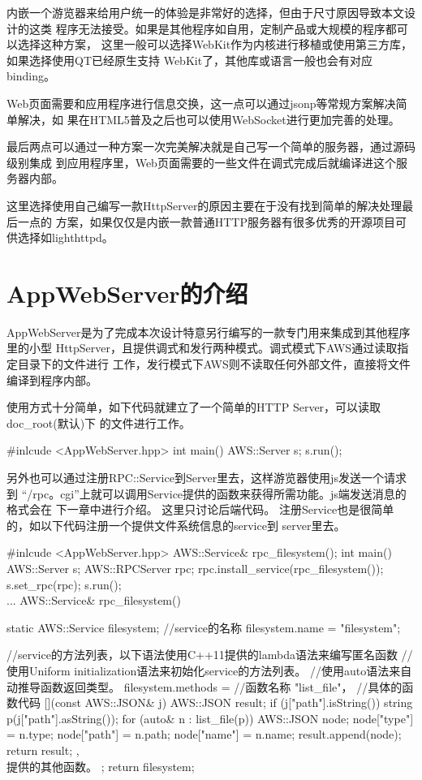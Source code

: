 内嵌一个游览器来给用户统一的体验是非常好的选择，但由于尺寸原因导致本文设计的这类
程序无法接受。如果是其他程序如自用，定制产品或大规模的程序都可以选择这种方案，
这里一般可以选择WebKit作为内核进行移植或使用第三方库，如果选择使用QT已经原生支持
WebKit了，其他库或语言一般也会有对应binding。

Web页面需要和应用程序进行信息交换，这一点可以通过jsonp等常规方案解决简单解决，如
果在HTML5普及之后也可以使用WebSocket进行更加完善的处理。

最后两点可以通过一种方案一次完美解决就是自己写一个简单的服务器，通过源码级别集成
到应用程序里，Web页面需要的一些文件在调式完成后就编译进这个服务器内部。

这里选择使用自己编写一款HttpServer的原因主要在于没有找到简单的解决处理最后一点的
方案，如果仅仅是内嵌一款普通HTTP服务器有很多优秀的开源项目可供选择如lighthttpd。

\section{AppWebServer的介绍} \label{sec:aws}
AppWebServer是为了完成本次设计特意另行编写的一款专门用来集成到其他程序里的小型
HttpServer，且提供调式和发行两种模式。调式模式下AWS通过读取指定目录下的文件进行
工作，发行模式下AWS则不读取任何外部文件，直接将文件编译到程序内部。

使用方式十分简单，如下代码就建立了一个简单的HTTP Server，可以读取doc\_root(默认)下
的文件进行工作。
\begin{cppcode}
#inlcude <AppWebServer.hpp>
int main()
{
	AWS::Server s;
	s.run();
}
\end{cppcode}
另外也可以通过注册RPC::Service到Server里去，这样游览器使用js发送一个请求到
``/rpc。cgi''上就可以调用Service提供的函数来获得所需功能。js端发送消息的格式会在
下一章中进行介绍。
这里只讨论后端代码。
注册Service也是很简单的，如以下代码注册一个提供文件系统信息的service到
server里去。
\begin{cppcode}
#inlcude <AppWebServer.hpp>
AWS::Service& rpc_filesystem();
int main()
{
	AWS::Server s;
	AWS::RPCServer rpc;
	rpc.install_service(rpc_filesystem());
	s.set_rpc(rpc);
	s.run();
}
\\...
AWS::Service& rpc_filesystem()
{
	static AWS::Service filesystem;
	//service的名称
	filesystem.name = "filesystem";

	//service的方法列表，以下语法使用C++11提供的lambda语法来编写匿名函数
	//使用Uniform initialization语法来初始化service的方法列表。
	//使用auto语法来自动推导函数返回类型。
	filesystem.methods = {
	{
		//函数名称
		"list_file"， 
		//具体的函数代码
		[](const AWS::JSON& j){
		AWS::JSON result;
		if (j["path"].isString()) {
			string p(j["path"].asString());
			for (auto& n : list_file(p)) {
				AWS::JSON node;
				node["type"] = n.type;
				node["path"] = n.path;
				node["name"] = n.name;
				result.append(node);
			}
		} 
		return result;
		}
	},
	{
		\\提供的其他函数。
	}
	};
	return filesystem;
}
\end{cppcode}

